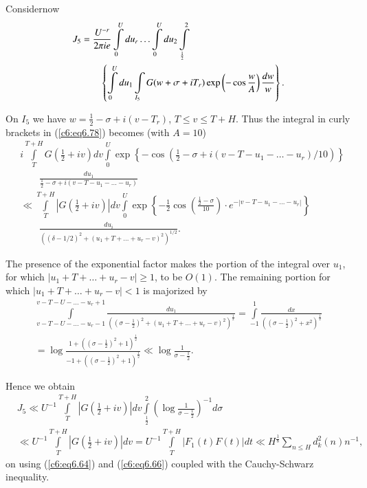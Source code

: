 Consider\pageoriginale now
\begin{align}
J_5 & = \frac{U^{-r}}{2 \pi i e} \int\limits^U_0 du_r \ldots
\int\limits^{U}_0 du_2 \int\limits^2_{\frac{1}{2}}\notag\\ 
& \qquad \left\{ \int\limits^U_0 du_1 \int\limits_{I_5} G (w+ \sigma +
i T_r) \exp \left(-\cos \frac{w}{A} \right) \frac{dw}{w} \right\}. 
\label{c6:eq6.78}
\end{align}

On $I_5$ we have  $w = \frac{1}{2} - \sigma +i (v-T_r)$, $T \leq v
\leq T + H$. Thus the integral in curly brackets in (\ref{c6:eq6.78})
becomes (with $A=10$) 
{\fontsize{10}{12}\selectfont
\begin{align*}
& i \int\limits^{T+H}_T G \left(\frac{1}{2} + iv \right) dv
  \int\limits^U_0 \exp \left\{-\cos \left(\frac{1}{2} - \sigma + i
  \left(v - T - u_1 - \ldots - u_r \right)/ 10 \right) \right\}\\[5pt] 
& \qquad \frac{du_1}{\frac{1}{2} - \sigma + i (v - T - u_1 - \ldots -
    u_r)}\\[5pt] 
& \ll \int\limits^{T+H}_T \left|G\left(\frac{1}{2} + iv\right)\right|
  dv \int\limits^U_0 \exp \left\{-\frac{1}{2} \cos \left(\frac{
    \frac{1}{2} - \sigma}{10}\right) \cdot e^{-|v-T-u_1-\ldots - u_r|}
  \right\}\\  
& \qquad \frac{du_i}{\left((\delta - 1/2)^2 + (u_1 + T + \ldots + u_r
    - v)^2\right)^{1/2}}.  
\end{align*}}

The presence of the exponential factor makes the portion of the
integral over $u_1$, for which $|u_1 + T + \ldots + u_r -v| \geq 1$,
to be $O(1)$. The remaining portion for which $|u_1 + T + \ldots + u_r
-v| < 1$ is majorized by  
{\fontsize{10}{12}\selectfont
\begin{gather*}
\int\limits^{v-T-U-\ldots - u_r +1}_{v - T - U-\ldots - u_r - 1}
\frac{du_1}{\left((\sigma -\frac{1}{2})^2 + (u_1 + T + \ldots + u_r
  -v)^2\right)^{\frac{1}{2}}} = \int\limits^1_{-1}
\frac{dx}{\left((\sigma -\frac{1}{2})^2 + x^2\right)^{\frac{1}{2}}}\\[5pt] 
= \log \frac{1+\left((\sigma -\frac{1}{2})^2 +
  1\right)^{\frac{1}{2}}}{-1 + \left((\sigma -\frac{1}{2})^2
  +1\right)^{\frac{1}{2}}} \ll \log \frac{1}{\sigma -\frac{1}{2}}.  
\end{gather*}}

Hence we obtain
{\fontsize{10pt}{12pt}\selectfont
\begin{align*}
& J_5 \ll U^{-1} \int\limits^{T + H}_T \left|G \left(\frac{1}{2} + iv
  \right)\right| dv \int\limits^2_{\frac{1}{2}} \left(\log \frac{1}{\sigma
    -\frac{1}{2}} \right)^{-1} d \sigma\\ 
& \ll U^{-1} \int\limits^{T+H}_T \left|G \left(\frac{1}{2} + iv
  \right)\right| dv = U^{-1} \int\limits^{T+H}_T |F_1(t) F(t)| dt \ll
  H^{\frac{1}{8}} \sum\limits_{n \leq H} d^2_k(n) n^{-1}, 
\end{align*}}
on using (\ref{c6:eq6.64}) and (\ref{c6:eq6.66}) coupled with the
Cauchy-Schwarz inequality. 
 

